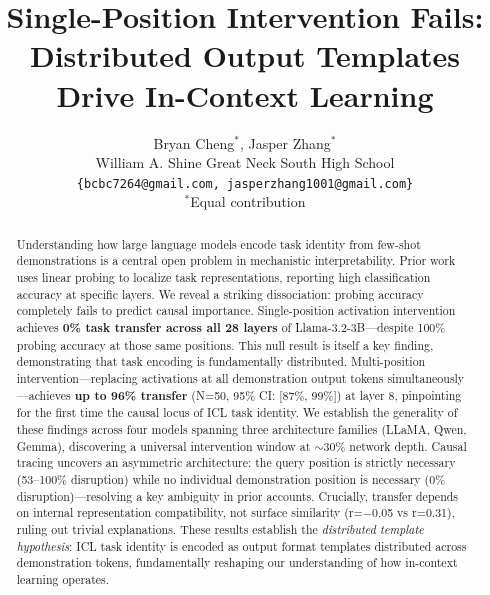 \documentclass[11pt]{article}
\begin{document}
\title{Single-Position Intervention Fails: \\
Distributed Output Templates Drive In-Context Learning}

\author{Bryan Cheng$^{*}$, Jasper Zhang$^{*}$ \\
William A. Shine Great Neck South High School \\
\texttt{\{bcbc7264@gmail.com, jasperzhang1001@gmail.com\}} \\
$^{*}$Equal contribution
}

\maketitle

\begin{abstract}
Understanding how large language models encode task identity from few-shot demonstrations is a central open problem in mechanistic interpretability. Prior work uses linear probing to localize task representations, reporting high classification accuracy at specific layers. We reveal a striking dissociation: probing accuracy completely fails to predict causal importance. Single-position activation intervention achieves \textbf{0\% task transfer across all 28 layers} of Llama-3.2-3B---despite 100\% probing accuracy at those same positions. This null result is itself a key finding, demonstrating that task encoding is fundamentally distributed. Multi-position intervention---replacing activations at all demonstration output tokens simultaneously---achieves \textbf{up to 96\% transfer} (N=50, 95\% CI: [87\%, 99\%]) at layer 8, pinpointing for the first time the causal locus of ICL task identity. We establish the generality of these findings across four models spanning three architecture families (LLaMA, Qwen, Gemma), discovering a universal intervention window at $\sim$30\% network depth. Causal tracing uncovers an asymmetric architecture: the query position is strictly necessary (53--100\% disruption) while no individual demonstration position is necessary (0\% disruption)---resolving a key ambiguity in prior accounts. Crucially, transfer depends on internal representation compatibility, not surface similarity (r=$-$0.05 vs r=0.31), ruling out trivial explanations. These results establish the \emph{distributed template hypothesis}: ICL task identity is encoded as output format templates distributed across demonstration tokens, fundamentally reshaping our understanding of how in-context learning operates.
\end{abstract}
\end{document}
